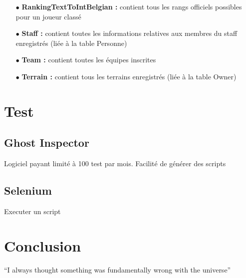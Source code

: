 \documentclass{article}
\begin{document}
\begin{itemize}
\item[$\bullet$]{\textbf{RankingTextToIntBelgian :}} contient tous les rangs officiels possibles pour un joueur classé

\item[$\bullet$]{\textbf{Staff  :}}  contient  toutes  les  informations  relatives  aux  membres  du  staff  enregistrés (liée à la table Personne)

\item[$\bullet$]{\textbf{Team :}} contient toutes les équipes inscrites

\item[$\bullet$]{\textbf{Terrain :}} contient tous les terrains enregistrés (liée à la table Owner)
\end{itemize}


\section{Test}
\subsection{Ghost Inspector}

Logiciel payant limité à 100 test par mois. Facilité de générer des scripts\\

\subsection{Selenium}

Executer un script\\

\section{Conclusion}
``I always thought something was fundamentally wrong with the universe'' \citep{adams1995hitchhiker}



\end{document}
